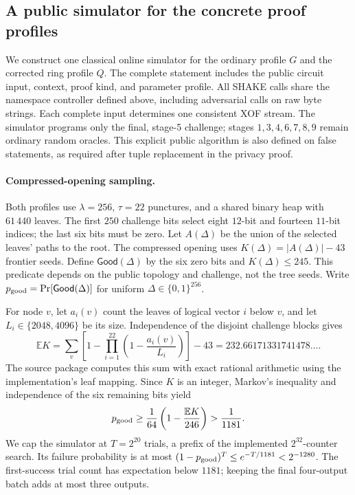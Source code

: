 \subsection{A public simulator for the concrete proof profiles}\label{app:public-simulation}

We construct one classical online simulator for the ordinary profile $G$ and
the corrected ring profile $Q$.  The complete statement includes the public
circuit input, context, proof kind, and parameter profile.  All SHAKE calls
share the namespace controller defined above, including adversarial calls on
raw byte strings.  Each complete input determines one consistent XOF stream.
The simulator programs only the final, stage-5 challenge; stages
$1,3,4,6,7,8,9$ remain ordinary random oracles.  This explicit public algorithm
is also defined on false statements, as required after tuple replacement in
the privacy proof.

\paragraph{Compressed-opening sampling.}
Both profiles use $\lambda=256$, $\tau=22$ punctures, and a shared binary heap
with $61\,440$ leaves.  The first $250$ challenge bits select eight $12$-bit
and fourteen $11$-bit indices; the last six bits must be zero.  Let
$A(\Delta)$ be the union of the selected leaves' paths to the root.  The
compressed opening uses $K(\Delta)=|A(\Delta)|-43$ frontier seeds.  Define
$\mathsf{Good}(\Delta)$ by the six zero bits and $K(\Delta)\le245$.
This predicate depends on the public topology and challenge, not the tree
seeds.  Write $p_{\rm good}=\Pr[\mathsf{Good}(\Delta)]$ for uniform
$\Delta\in\{0,1\}^{256}$.

For node $v$, let $a_i(v)$ count the leaves of logical vector $i$ below $v$,
and let $L_i\in\{2048,4096\}$ be its size.  Independence of the disjoint
challenge blocks gives
\[
 \mathbb E K=\sum_v\left[1-\prod_{i=1}^{22}
          \left(1-\frac{a_i(v)}{L_i}\right)\right]-43
          =232.66171331741478\ldots .
\]
The source package computes this sum with exact rational arithmetic using
the implementation's leaf mapping.  Since $K$ is an integer, Markov's
inequality and independence of the six remaining bits yield
\[
 p_{\rm good}\ge\frac{1}{64}
       \left(1-\frac{\mathbb E K}{246}\right)>\frac1{1181}.
\]
We cap the simulator at $T=2^{20}$ trials, a prefix of the implemented
$2^{32}$-counter search.  Its failure probability is at most
$(1-p_{\rm good})^T\le e^{-T/1181}<2^{-1280}$.  The first-success trial count
has expectation below $1181$; keeping the final four-output batch adds at
most three outputs.

